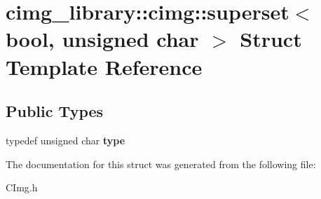 \hypertarget{structcimg__library_1_1cimg_1_1superset_3_01bool_00_01unsigned_01char_01_4}{\section{cimg\-\_\-library\-:\-:cimg\-:\-:superset$<$ bool, unsigned char $>$ Struct Template Reference}
\label{structcimg__library_1_1cimg_1_1superset_3_01bool_00_01unsigned_01char_01_4}
}
\subsection*{Public Types}
\begin{DoxyCompactItemize}
\item 
\hypertarget{structcimg__library_1_1cimg_1_1superset_3_01bool_00_01unsigned_01char_01_4_aa5fd513128d1d8e68e2cebed957b32dd}{typedef unsigned char {\bfseries type}}\label{structcimg__library_1_1cimg_1_1superset_3_01bool_00_01unsigned_01char_01_4_aa5fd513128d1d8e68e2cebed957b32dd}

\end{DoxyCompactItemize}


The documentation for this struct was generated from the following file\-:\begin{DoxyCompactItemize}
\item 
C\-Img.\-h\end{DoxyCompactItemize}
